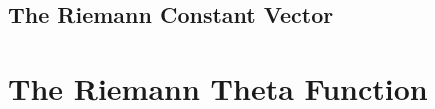 \subsection{The Riemann Constant
  Vector}\label{subsec:background-the-riemann-constant-vector}

\section{The Riemann Theta
  Function}\label{sec:background-riemann-theta-function}
